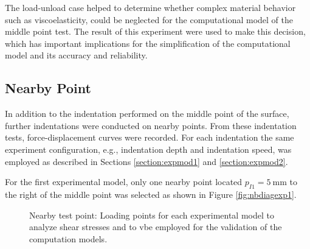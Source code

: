The load-unload case helped to determine whether complex material behavior such as 
viscoelasticity, could be neglected for the computational model of the middle point test.
The result of this experiment were used to make this decision, which has important 
implications for the simplification of the computational model and its accuracy and reliability.

\subsection{Nearby Point}
\label{subsection:nearbypoint}
In addition to the indentation performed on the middle point of the surface, further 
indentations were conducted on nearby points. From these indentation tests, force-displacement 
curves were recorded. For each indentation the same experiment configuration, 
e.g., indentation depth and indentation 
speed, was employed as described in Sections \ref{section:expmod1} and \ref{section:expmod2}.

For the first experimental model, only one nearby point located $p_{I1} = \SI{5}{\milli \m}$ 
to the right of the middle point was selected as shown in Figure \ref{fig:nbdiagexp1}.

\begin{figure}%
    \centering
   \qquad
   \caption{Nearby test point: Loading points for each experimental model to analyze shear stresses and to vbe employed for the validation of the computation models.}%
   \label{fig:nbexp}%
\end{figure}

